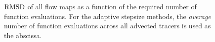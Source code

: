 \begin{figure}[htpb]
    \centering
    
    \caption[$\rmsd$ of all flow maps as a function of the required number of
    function evaluations]{$\rmsd$ of all flow maps as a function of the required number of
    function evaluations. For the adaptive stepsize methods, the \emph{average}
    number of function evaluations across all advected tracers is used as the
    abscissa.}
    \label{fig:flowmap_err_both}
\end{figure}
